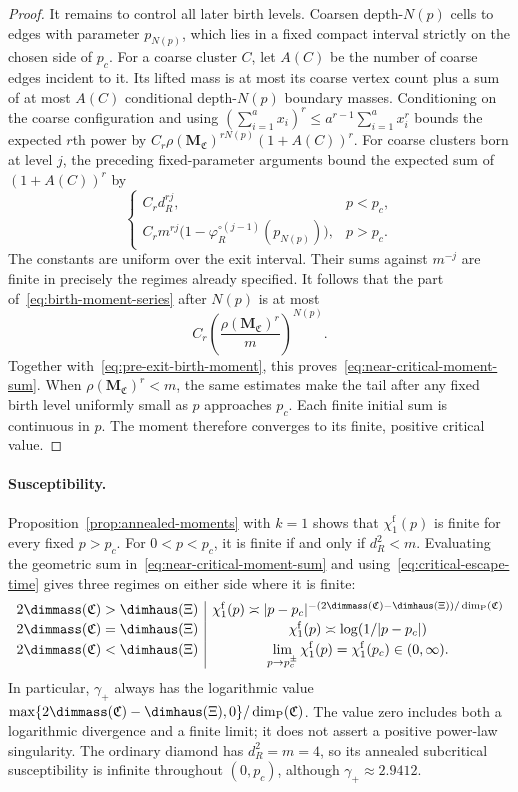 \begin{proof}
It remains to control all later birth levels.
Coarsen depth-$N(p)$ cells to edges with parameter $p_{N(p)}$, which lies in a fixed compact interval strictly on the chosen side of $p_c$.
For a coarse cluster $C$, let $A(C)$ be the number of coarse edges incident to it.
Its lifted mass is at most its coarse vertex count plus a sum of at most $A(C)$ conditional depth-$N(p)$ boundary masses.
Conditioning on the coarse configuration and using
$(\sum_{i=1}^a x_i)^r\le a^{r-1}\sum_{i=1}^a x_i^r$ bounds the expected $r$th power by
$C_r\rho(\mathbf M_{\mathfrak C})^{rN(p)}(1+A(C))^r$.
For coarse clusters born at level $j$, the preceding fixed-parameter arguments bound the expected sum of $(1+A(C))^r$ by
\[
 \begin{cases}
 C_rd_R^{rj},&p<p_c,\\
 C_rm^{rj}\bigl(1-\varphi_R^{\circ(j-1)}(p_{N(p)})\bigr),&p>p_c.
 \end{cases}
\]
The constants are uniform over the exit interval.
Their sums against $m^{-j}$ are finite in precisely the regimes already specified.
It follows that the part of~\eqref{eq:birth-moment-series} after $N(p)$ is at most
\[
 C_r\left(\frac{\rho(\mathbf M_{\mathfrak C})^r}{m}\right)^{N(p)}.
\]
Together with~\eqref{eq:pre-exit-birth-moment}, this proves~\eqref{eq:near-critical-moment-sum}.
When $\rho(\mathbf M_{\mathfrak C})^r<m$, the same estimates make the tail after any fixed birth level uniformly small as $p$ approaches $p_c$.
Each finite initial sum is continuous in $p$.
The moment therefore converges to its finite, positive critical value.
\end{proof}


\paragraph{Susceptibility.}
Proposition~\ref{prop:annealed-moments} with $k=1$ shows that $\chi_1^{\mathrm f}(p)$ is finite for every fixed $p>p_c$.
For $0<p<p_c$, it is finite if and only if $d_R^2<m$.
Evaluating the geometric sum in~\eqref{eq:near-critical-moment-sum} and using~\eqref{eq:critical-escape-time} gives three regimes on either side where it is finite:
\[
 \begin{array}{c|c}
 2\dimmass(\mathfrak C)>\dimhaus(\Xi)
 &\chi_1^{\mathrm f}(p)\asymp
 |p-p_c|^{-(2\dimmass(\mathfrak C)-\dimhaus(\Xi))/\dim_{\mathrm P}(\mathfrak C)}\\[2pt]
 2\dimmass(\mathfrak C)=\dimhaus(\Xi)
 &\chi_1^{\mathrm f}(p)\asymp\log(1/|p-p_c|)\\[2pt]
 2\dimmass(\mathfrak C)<\dimhaus(\Xi)
 &\displaystyle\lim_{p\to p_c^\pm}\chi_1^{\mathrm f}(p)=\chi_1^{\mathrm f}(p_c)\in(0,\infty).
 \end{array}
\]
In particular, $\gamma_+$ always has the logarithmic value
$\max\{2\dimmass(\mathfrak C)-\dimhaus(\Xi),0\}/\dim_{\mathrm P}(\mathfrak C)$.
The value zero includes both a logarithmic divergence and a finite limit; it does not assert a positive power-law singularity.
The ordinary diamond has $d_R^2=m=4$, so its annealed subcritical susceptibility is infinite throughout $(0,p_c)$, although $\gamma_+\approx2.9412$.


